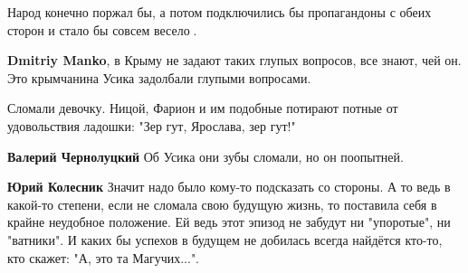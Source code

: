 \begin{itemize}
\begin{itemize}
Народ конечно поржал бы, а потом подключились бы пропагандоны с обеих сторон и стало бы совсем весело🤣.

 
\textbf{Dmitriy Manko}, в Крыму не задают таких глупых вопросов, все знают, чей он. Это крымчанина Усика задолбали глупыми вопросами.
\end{itemize}

 
Сломали девочку. Ницой, Фарион и им подобные потирают потные от удовольствия
ладошки: "Зер гут, Ярослава, зер гут!"

\begin{itemize}
 
\textbf{Валерий Чернолуцкий} Об Усика они зубы сломали, но он поопытней.

 
\textbf{Юрий Колесник} 
Значит надо было кому-то подсказать со стороны. А то ведь в какой-то степени,
если не сломала свою будущую жизнь, то поставила себя в крайне неудобное
положение. Ей ведь этот эпизод не забудут ни "упоротые", ни "ватники". И каких
бы успехов в будущем не добилась всегда найдётся кто-то, кто скажет: "А, это та
Магучих...".

\end{itemize}

 


\end{itemize}
